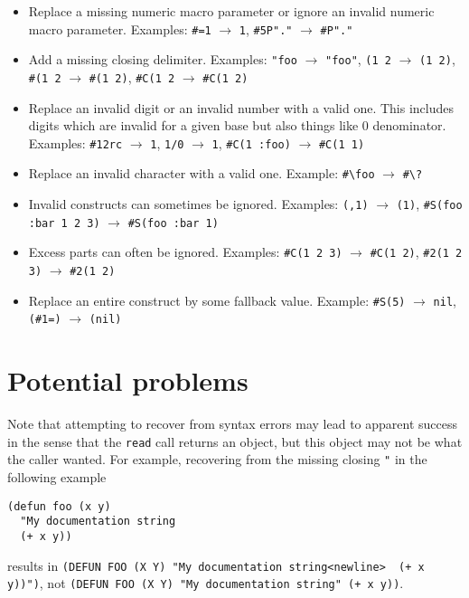 \newcommand{\RecoverExample}[2]{\texttt{#1} $\rightarrow$ \texttt{#2}}

\begin{itemize}
\item Replace a missing numeric macro parameter or ignore an invalid
  numeric macro parameter.  Examples: \RecoverExample{\#=1}{1},
  \RecoverExample{\#5P"."}{\#P"."}

\item Add a missing closing delimiter.  Examples:
  \RecoverExample{"foo}{"foo"}, \RecoverExample{(1 2}{(1 2)},
  \RecoverExample{\#(1 2}{\#(1 2)}, \RecoverExample{\#C(1 2}{\#C(1 2)}

\item Replace an invalid digit or an invalid number with a valid one.
  This includes digits which are invalid for a given base but also
  things like $0$ denominator.  Examples: \RecoverExample{\#12rc}{1},
  \RecoverExample{1/0}{1}, \RecoverExample{\#C(1 :foo)}{\#C(1 1)}

\item Replace an invalid character with a valid one.  Example:
  \RecoverExample{\#\textbackslash{}foo}{\#\textbackslash{}?}

\item Invalid constructs can sometimes be ignored.  Examples:
  \RecoverExample{(,1)}{(1)}, \RecoverExample{\#S(foo :bar 1 2
    3)}{\#S(foo :bar 1)}

\item Excess parts can often be ignored.  Examples:
  \RecoverExample{\#C(1 2 3)}{\#C(1 2)}, \RecoverExample{\#2(1 2
    3)}{\#2(1 2)}

\item Replace an entire construct by some fallback value.  Example:
  \RecoverExample{\#S(5)}{nil}, \RecoverExample{(\#1=)}{(nil)}

\end{itemize}

\section{Potential problems}
\label{sec:potential-problems}

Note that attempting to recover from syntax errors may lead to
apparent success in the sense that the \texttt{read} call returns an
object, but this object may not be what the caller wanted.  For
example, recovering from the missing closing \texttt{"} in the
following example

\begin{Verbatim}[frame=single]
(defun foo (x y)
  "My documentation string
  (+ x y))
\end{Verbatim}

results in \verb!(DEFUN FOO (X Y) "My documentation string<newline>  (+ x y))")!,
not \verb!(DEFUN FOO (X Y) "My documentation string" (+ x y))!.
